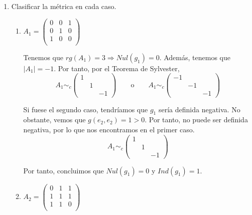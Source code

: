 \begin{ejercicio}
    \begin{enumerate}
        \item Clasificar la métrica en cada caso.
        \begin{enumerate}
            \item $A_1 = \left(\begin{array}{ccc}
                    0 & 0 & 1 \\
                    0 & 1 & 0 \\
                    1 & 0 & 0 \\
                \end{array} \right)$

            Tenemos que $rg(A_1) = 3 \Longrightarrow Nul(g_1)=0$. Además, tenemos que \\ $|A_1|=-1$. Por tanto, por el Teorema de Sylvester,
            \begin{equation*}
                A_1 \sim_c \left(\begin{array}{ccc}
                    1 &  \\
                    & 1 \\
                    && -1 
                \end{array} \right)
                \qquad \text{o} \qquad
                A_1 \sim_c \left(\begin{array}{ccc}
                    -1 &  \\
                    & -1 \\
                    && -1 
                \end{array} \right)
            \end{equation*}

            Si fuese el segundo caso, tendríamos que $g_1$ sería definida negativa. No obstante, vemos que $g(e_2, e_2)=1>0$. Por tanto, no puede ser definida negativa, por lo que nos encontramos en el primer caso.
            \begin{equation*}
                A_1 \sim_c \left(\begin{array}{ccc}
                    1 &  \\
                    & 1 \\
                    && -1 
                \end{array} \right)
            \end{equation*}
            
            Por tanto, concluimos que $Nul(g_1)=0$ y $Ind(g_1)=1$.

            \item $A_2 = \left(\begin{array}{ccc}
                    0 & 1 & 1 \\
                    1 & 1 & 1 \\
                    1 & 1 & 0 \\
                \end{array} \right)$


\end{enumerate}
\end{enumerate}
\end{ejercicio}
